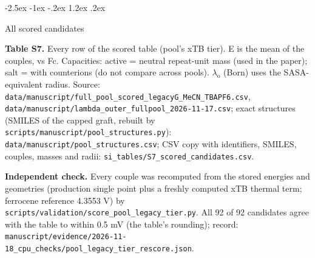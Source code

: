\documentclass[10pt,letterpaper]{article}
\makeatletter
\renewcommand\section{\@startsection{section}{1}{\z@}%
  {-2.5ex \@plus -1ex \@minus -.2ex}%
  {1.2ex \@plus .2ex}%
  {\normalfont\large\bfseries\raggedright}}
\makeatother
\begin{document}
\begin{landscape}
\section{All scored candidates}

\noindent \textbf{Table S7.} Every row of the scored table (pool's xTB tier). E is the mean of the couples, vs Fc. Capacities: active = neutral repeat-unit mass (used in the paper); salt = with counterions (do not compare across pools). $\lambda_{\mathrm{o}}$ (Born) uses the SASA-equivalent radius. Source: \texttt{data/\allowbreak{}manuscript/\allowbreak{}full\_\allowbreak{}pool\_\allowbreak{}scored\_\allowbreak{}legacyG\_\allowbreak{}MeCN\_\allowbreak{}TBAPF6.\allowbreak{}csv}, \texttt{data/\allowbreak{}manuscript/\allowbreak{}lambda\_\allowbreak{}outer\_\allowbreak{}fullpool\_\allowbreak{}2026-\allowbreak{}11-\allowbreak{}17.\allowbreak{}csv}; exact structures (SMILES of the capped graft, rebuilt by \texttt{scripts/\allowbreak{}manuscript/\allowbreak{}pool\_\allowbreak{}structures.\allowbreak{}py}): \texttt{data/\allowbreak{}manuscript/\allowbreak{}pool\_\allowbreak{}structures.\allowbreak{}csv}; CSV copy with identifiers, SMILES, couples, masses and radii: \texttt{si\_\allowbreak{}tables/\allowbreak{}S7\_\allowbreak{}scored\_\allowbreak{}candidates.\allowbreak{}csv}.


\noindent \textbf{Independent check.} Every couple was recomputed from the stored energies and geometries (production single point plus a freshly computed xTB thermal term; ferrocene reference 4.3553 V) by \texttt{scripts/\allowbreak{}validation/\allowbreak{}score\_\allowbreak{}pool\_\allowbreak{}legacy\_\allowbreak{}tier.\allowbreak{}py}. All 92 of 92 candidates agree with the table to within 0.5 mV (the table's rounding); record: \texttt{manuscript/\allowbreak{}evidence/\allowbreak{}2026-\allowbreak{}11-\allowbreak{}18\_\allowbreak{}cpu\_\allowbreak{}checks/\allowbreak{}pool\_\allowbreak{}legacy\_\allowbreak{}tier\_\allowbreak{}rescore.\allowbreak{}json}.


\end{landscape}
\end{document}
